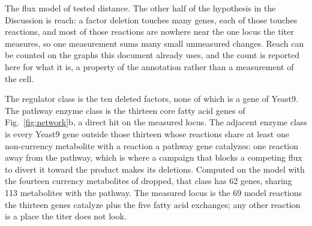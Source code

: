 \begin{figure}[t]
\end{figure}


The flux model of  tested distance. The other half of the
hypothesis in the Discussion is reach: a factor deletion touches many genes, each of those
touches reactions, and most of those reactions are nowhere near the one locus the titer
measures, so one measurement sums many small unmeasured changes. Reach can be counted on
the graphs this document already uses, and the count is reported here for what it is, a
property of the annotation rather than a measurement of the cell.

 The regulator class is the ten deleted factors, none of
which is a gene of Yeast9. The pathway enzyme class is the thirteen core fatty acid genes
of Fig.~\ref{fig:network}b, a direct hit on the measured locus. The adjacent enzyme class
is every Yeast9 gene outside those thirteen whose reactions share at least one
non-currency metabolite with a reaction a pathway gene catalyzes: one reaction away from
the pathway, which is where a campaign that blocks a competing flux to divert it toward
the product makes its deletions. Computed on the model with the fourteen currency
metabolites of  dropped, that class has 62 genes, sharing 113
metabolites with the pathway. The measured locus is the 69 model reactions the thirteen
genes catalyze plus the five fatty acid exchanges; any other reaction is a place the
titer does not look.

